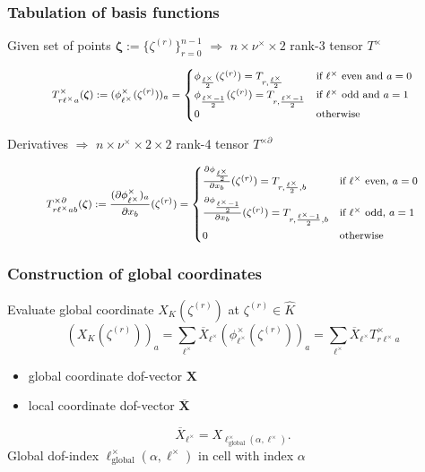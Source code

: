 \documentclass{beamer}
\renewcommand{\vec}[1]{\boldsymbol{#1}}
\begin{document}

\begin{frame}
  \frametitle{Tabulation of basis functions}
Given set of points $\boldsymbol{\zeta}:=\{\zeta^{(r)}\}_{r=0}^{n-1}$ $\Rightarrow$ $n \times \nu^\times \times 2$ rank-3 tensor $T^\times$

$$
{\footnotesize
T^\times_{r\ell^\times a}(\boldsymbol{\zeta}) := (\phi^\times_{\ell^\times}(\zeta^{(r)}))_a = 
\begin{cases}
\phi_{\frac{\ell^\times}{2}}(\zeta^{(r)}) = T_{r,\frac{\ell^\times}{2}}& \text{if $\ell^\times$ even and $a=0$} \\
\phi_{\frac{\ell^\times-1}{2}}(\zeta^{(r)}) = T_{r,\frac{\ell^\times-1}{2}} & \text{if $\ell^\times$ odd and $a=1$} \\
0 & \text{otherwise}
\end{cases}}
$$

Derivatives $\Rightarrow$ $n \times \nu^\times \times 2\times 2$ rank-4 tensor $T^{\times\partial}$ 

$$
{\footnotesize
T^{\times\partial}_{r\ell^\times ab}(\boldsymbol{\zeta}) := \frac{(\partial \phi^\times_{\ell^\times})_a}{\partial x_b}(\zeta^{(r)})  = \begin{cases}
\frac{\partial\phi_{\frac{\ell^\times}{2}}}{\partial x_b}(\zeta^{(r)}) = T_{r,\frac{\ell^\times}{2},b}& \text{if $\ell^\times$ even, $a=0$} \\[2ex]
\frac{\partial\phi_{\frac{\ell^\times-1}{2}}}{\partial x_b}(\zeta^{(r)}) = T_{r,\frac{\ell^\times-1}{2},b} & \text{if $\ell^\times$ odd, $a=1$} \\[2ex]
0 & \text{otherwise}
\end{cases}}
$$
\end{frame}


\begin{frame}
  \frametitle{Construction of global coordinates}
Evaluate global coordinate $X_K(\zeta^{(r)})$ at $\zeta^{(r)}\in\widehat{K}$
$$
(X_K(\zeta^{(r)}))_a = \sum_{\ell^\times} \overline{X}_{\ell^\times} \left(\phi_{\ell^\times}^\times(\zeta^{(r)})\right)_a = \sum_{\ell^\times} \overline{X}_{\ell^\times} T^\times_{r\ell^\times a} 
$$
\begin{itemize}
  \item global coordinate dof-vector $\vec{X}$
  \item local coordinate dof-vector $\overline{\boldsymbol{X}}$
\end{itemize}
$$
\overline{X}_{\ell^\times} = X_{\ell^\times_{\text{global}}(\alpha,\ell^\times)}.
$$
Global dof-index $\ell^\times_{\text{global}}(\alpha,\ell^\times)$ in cell with index $\alpha$
\end{frame}
\end{document}
